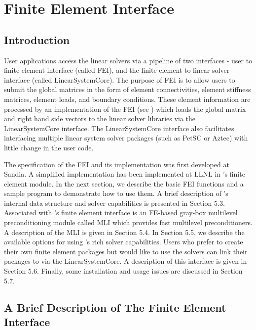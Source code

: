 \chapter{Finite Element Interface}
\label{ch-FEI}

\section{Introduction}

User applications access the \hypre{} linear solvers via a pipeline of
two interfaces - user to finite element interface (called {\sf FEI}),
and the finite element to linear solver interface (called 
{\sf LinearSystemCore}). The purpose of {\sf FEI} is to allow users 
to submit the global matrices in the form of element connectivities, 
element stiffness matrices, element loads, and boundary conditions. 
These element information are processed by an implementation of the 
{\sf FEI} (see \cite{FEI-ref}) which loads the global matrix and right
hand side vectors to the linear solver libraries via the 
{\sf LinearSystemCore} interface.
The {\sf LinearSystemCore} interface also facilitates interfacing 
multiple linear system solver packages (such as PetSC or Aztec)
with little change in the user code.

The specification of the {\sf FEI} and its implementation was first
developed at Sandia. A simplified implementation has been implemented
at LLNL in \hypre{}'s finite element module. In the next section, we 
describe the basic {\sf FEI} functions and a sample program to 
demonstrate how to use them. A brief description of \hypre{}'s 
internal data structure and solver capabilities is presented in 
Section 5.3.  Associated with \hypre{}'s finite element interface is 
an FE-based gray-box multilevel preconditioning module called 
{\sf MLI} which provides fast multilevel preconditioners.
A description of the {\sf MLI} is given in Section 5.4.
In Section 5.5, we describe the available options for using \hypre{}'s
rich solver capabilities. Users who prefer to create their own finite
element packages but would like to use the \hypre{} solvers can link their
packages to \hypre{} via the {\sf LinearSystemCore}. A description
of this interface is given in Section 5.6.  Finally, some installation 
and usage issues are discussed in Section 5.7.

\section{A Brief Description of The Finite Element Interface}

